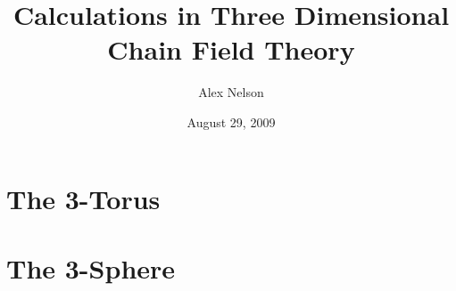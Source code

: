 \documentclass{amsart}
\title{Calculations in Three Dimensional Chain Field Theory}
\date{August 29, 2009}
\author{Alex Nelson}
\begin{document}
\maketitle

\section{The 3-Torus}

\section{The 3-Sphere}


\nocite{*}


\end{document}
